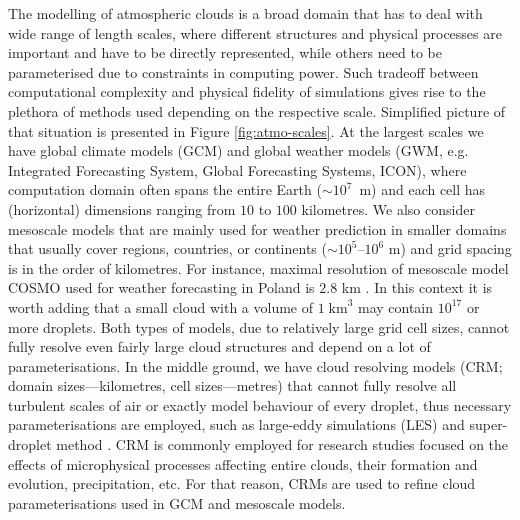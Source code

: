 \documentclass{pracamgren}
\begin{document}
The modelling of atmospheric clouds is a broad domain that has to deal with wide range of length scales, where different structures and physical processes are important and have to be directly represented, while others need to be parameterised due to constraints in computing power.
Such tradeoff between computational complexity and physical fidelity of simulations gives rise to the plethora of methods used depending on the respective scale.
Simplified picture of that situation is presented in Figure \ref{fig:atmo-scales}.
At the largest scales we have global climate models (GCM) and global weather models (GWM, e.g. Integrated Forecasting System, Global Forecasting Systems, ICON), where computation domain  often spans the entire Earth ($\sim 10^{7}$~m) and each cell has (horizontal) dimensions ranging from $10$ to $100$ kilometres.
We also consider mesoscale models that are mainly used for weather prediction in smaller domains that usually cover regions, countries, or continents ($\sim 10^{5} \text{--} 10^{6}$ m) and grid spacing is in the order of kilometres.
For instance, maximal resolution of mesoscale model COSMO used for weather forecasting in Poland is $2.8$ km \parencite{Doms2021}.
In this context it is worth adding that a small cloud with a volume of $1 \; \text{km}^3$ may contain $10^{17}$ or more droplets.
Both types of models, due to relatively large grid cell sizes, cannot fully resolve even fairly large cloud structures and depend on a lot of parameterisations.
In the middle ground, we have cloud resolving models (CRM; domain sizes---kilometres, cell sizes---metres) that cannot fully resolve all turbulent scales of air or exactly model behaviour of every droplet, thus necessary parameterisations are employed, such as large-eddy simulations (LES) and super-droplet method \parencite{Arabas2013}.
CRM is commonly employed for research studies focused on the effects of microphysical processes affecting entire clouds, their formation and evolution, precipitation, etc.
For that reason, CRMs are used to refine cloud parameterisations used in GCM and mesoscale models.
\end{document}
